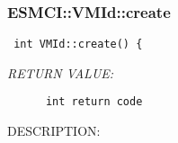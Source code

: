  
\setlength{\oldparskip}{\parskip}
\setlength{\parskip}{1.5ex}
\setlength{\oldparindent}{\parindent}
\setlength{\parindent}{0pt}
\setlength{\oldbaselineskip}{\baselineskip}
\setlength{\baselineskip}{11pt}
 
\def\bv{\begin{verbatim}}
\def\ev{\end{verbatim}}
\def\be{\begin{equation}}
\def\ee{\end{equation}}
\def\bea{\begin{eqnarray}}
\def\eea{\end{eqnarray}}
\def\bi{\begin{itemize}}
\def\ei{\end{itemize}}
\def\bn{\begin{enumerate}}
\def\en{\end{enumerate}}
\def\bd{\begin{description}}
\def\ed{\end{description}}
\def\({\left (}
\def\){\right )}
\def\[{\left [}
\def\]{\right ]}
\def\<{\left  \langle}
\def\>{\right \rangle}
\def\cI{{\cal I}}
\def\diag{\mathop{\rm diag}}
\def\tr{\mathop{\rm tr}}


 
\subsubsection [ESMCI::VMId::create] {ESMCI::VMId::create}


  
\begin{verbatim} int VMId::create() {\end{verbatim}{\em RETURN VALUE:}
\begin{verbatim}      int return code\end{verbatim}
{\sf DESCRIPTION:\\ }



